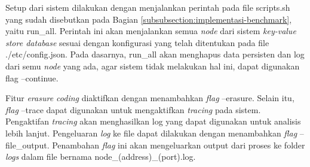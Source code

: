 Setup dari sistem dilakukan dengan menjalankan perintah pada file scripts.sh yang sudah disebutkan pada Bagian \ref{subsubsection:implementasi-benchmark}, yaitu run\_all. Perintah ini akan menjalankan semua \textit{node} dari sistem \textit{key-value store database} sesuai dengan konfigurasi yang telah ditentukan pada file ./etc/config.json. Pada dasarnya, run\_all akan menghapus data persisten dan log dari semu \textit{node} yang ada, agar sistem tidak melakukan hal ini, dapat digunakan flag --continue.

Fitur \textit{erasure coding} diaktifkan dengan menambahkan \textit{flag} --erasure. Selain itu, \textit{flag} --trace dapat digunakan untuk mengaktifkan \textit{tracing} pada sistem. Pengaktifan \textit{tracing} akan menghasilkan log yang dapat digunakan untuk analisis lebih lanjut. Pengeluaran \textit{log} ke file dapat dilakukan dengan menambahkan \textit{flag} --file\_output. Penambahan \textit{flag} ini akan mengeluarkan output dari proses ke folder \textit{logs} dalam file bernama node\_(address)\_(port).log.